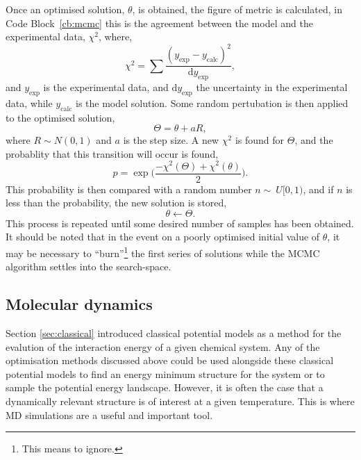 Once an optimised solution, $\theta$, is obtained, the figure of metric is calculated, in Code Block~\ref{cb:mcmc} this is the agreement between the model and the experimental data, $\chi^2$, where,
%
\begin{equation}
\chi^2 = \sum\frac{(y_{\text{exp}} - y_{\text{calc}})^2}{\text{d}y_{\text{exp}}},
\end{equation}
%
and $y_{\text{exp}}$ is the experimental data, and $\text{d}y_{\text{exp}}$ the uncertainty in the experimental data, while $y_{\text{calc}}$ is the model solution.
Some random pertubation is then applied to the optimised solution,
%
\begin{equation}
\Theta = \theta + aR,
\end{equation}
%
where $R\sim N(0, 1)$ and $a$ is the step size.
A new $\chi^2$ is found for $\Theta$, and the probablity that this transition will occur is found,
%
\begin{equation}
p = \exp{\bigg(\frac{-\chi^2(\Theta) + \chi^2(\theta)}{2}\bigg)}.
\end{equation}
%
This probability is then compared with a random number $n\sim~U[0, 1)$, and if $n$ is less than the probability, the new solution is stored,
%
\begin{equation}
\theta \leftarrow \Theta.
\end{equation}
%
This process is repeated until some desired number of samples has been obtained.
It should be noted that in the event on a poorly optimised initial value of $\theta$, it may be necessary to ``burn''\footnote{This means to ignore.} the first series of solutions while the MCMC algorithm settles into the search-space.

\subsection{Molecular dynamics}
\label{sec:md}
Section \ref{sec:classical} introduced classical potential models as a method for the evalution of the interaction energy of a given chemical system.
Any of the optimisation methods discussed above could be used alongside these classical potential models to find an energy minimum structure for the system or to sample the potential energy landscape.
However, it is often the case that a dynamically relevant structure is of interest at a given temperature.
This is where MD simulations are a useful and important tool.

